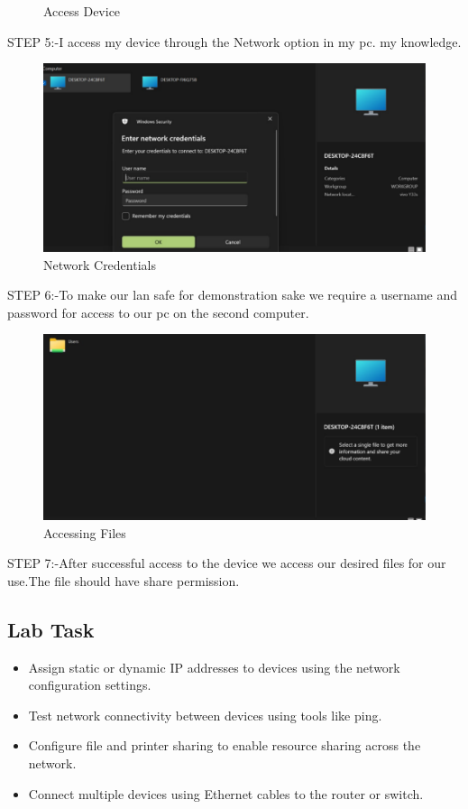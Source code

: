\documentclass[a4paper,9pt]{article}
\begin{document}
\begin{enumerate}
\begin{figure}[H]
		\caption{Access Device}
	\end{figure}
	STEP 5:-I access my device through the Network option in my pc.
	my knowledge.
	\begin{figure}[H]
		\centering
		\includegraphics[width=0.8\linewidth]{6.7.png}
		\caption{Network Credentials }
	\end{figure}
	STEP 6:-To make our lan safe for demonstration sake we require a username and password for access to our pc on the
	second computer.
	\begin{figure}[H]
		\centering
		\includegraphics[width=0.8\linewidth]{6.8.png}
		\caption{Accessing Files}
	\end{figure}
	STEP 7:-After successful access to the device we access our desired files for our use.The file should have share permission.
	
\end{enumerate}

\subsection{Lab Task}

\begin{itemize}
	\item Assign static or dynamic IP addresses to devices using the network configuration settings.
	\item Test network connectivity between devices using tools like ping.
	\item Configure file and printer sharing to enable resource sharing across the network.
	
	\item Connect multiple devices using Ethernet cables to the router or switch.
\end{itemize}
\end{document}
